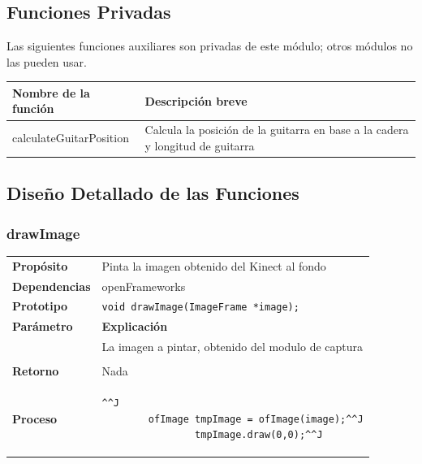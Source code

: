 \documentclass[a4paper,10pt]{article}
\begin{document}
\subsection{Funciones Privadas}
Las siguientes funciones auxiliares son privadas de este módulo; otros módulos
no las pueden usar.~\\

\begin{tabular}{| p{30mm} | p{10cm} |}
        \hline
        \textbf{Nombre de la \mbox{función}} & \textbf{Descripción breve} \\
        \hline
        calculateGuitarPosition & Calcula la posición de la guitarra en base a la cadera y longitud de guitarra \\
        \hline
\end{tabular}
\subsection{Diseño Detallado de las Funciones}
\subsubsection{drawImage}
\begin{tabularx}{\textwidth}{p{25mm} X}
        \textbf{Propósito} & Pinta la imagen obtenido del Kinect al fondo\\
        \textbf{Dependencias} & openFrameworks \\
        \textbf{Prototipo} & \lstinline{void drawImage(ImageFrame *image);}\\
        \textbf{Parámetro} & \textbf{Explicación} \\
        \begin{tabular}{p{2cm} l}
               image & La imagen a pintar, obtenido del modulo de captura\\
        \end{tabular}\\

        \textbf{Retorno} & Nada\\
        \textbf{Proceso} & 
        \begin{lstlisting}^^J
        ofImage tmpImage = ofImage(image);^^J
                tmpImage.draw(0,0);^^J
        \end{lstlisting}

\end{tabularx}
\end{document}

